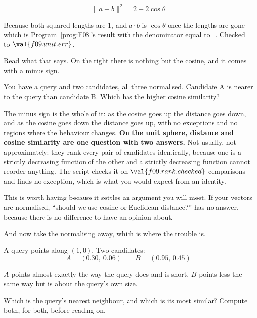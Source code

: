 \begin{fr}
\begin{ansblock}
\[ \lVert a - b \rVert^{2} = 2 - 2\cos\theta \]
\end{ansblock}

Because both squared lengths are $1$, and $a \cdot b$ is $\cos\theta$ once the
lengths are gone \dash{} which is Program~\ref{prog:F08}'s result with the
denominator equal to $1$. Checked to $\val{f09.unit.err}$.

Read what that says. On the right there is nothing but the cosine, and it
comes with a minus sign.

You have a query and two candidates, all three normalised. Candidate A is
nearer to the query than candidate B. Which has the higher cosine similarity?
\dotline
\nextframe
\end{fr}

\begin{fr}
The minus sign is the whole of it: as the cosine goes up the distance goes
down, and as the cosine goes down the distance goes up, with no exceptions and
no regions where the behaviour changes. \textbf{On the unit sphere, distance
and cosine similarity are one question with two answers.} Not usually, not
approximately: they rank every pair of
candidates identically, because one is a strictly decreasing function of the
other and a strictly decreasing function cannot reorder anything. The script
checks it on $\val{f09.rank.checked}$ comparisons and finds no exception,
which is what you would expect from an identity.

This is worth having because it settles an argument you will meet. If your
vectors are normalised, \enquote{should we use cosine or Euclidean distance?}
has no answer, because there is no difference to have an opinion about.

\end{fr}

\begin{fr}
And now take the normalising away, which is where the trouble is.

A query points along $(1, 0)$. Two candidates:
\[ A = (\num{0.30},\ \num{0.06}) \qquad B = (\num{0.95},\ \num{0.45}) \]

$A$ points almost exactly the way the query does and is short. $B$ points less
the same way but is about the query's own size.

Which is the query's nearest neighbour, and which is its most similar? Compute
both, for both, before reading on.
\dotline
\nextframe
\end{fr}

